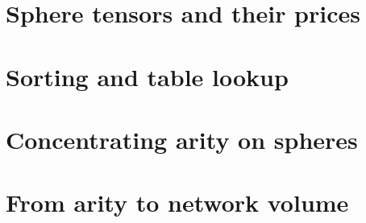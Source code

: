 \documentclass[11pt]{article}
\begin{document}
\maketitle

\begin{abstract}
We prove that the exponent of square matrix multiplication is \(9/4\) over
every field. The upper bound was known. For each \(n\ge2\), a formal
arithmetic circuit multiplying two \(n\times n\) matrices needs at least
\(n^{9/4}/2\) multiplication or division gates. The proof shows that a smaller exponent would compress tensor networks
enough to violate a lower bound for testing whether the entries in each
of several independent lists are distinct.
\end{abstract}



\clearpage
{\small\tableofcontents}
\clearpage






\par{}
\part{Sphere tensors and their prices}\label{part:spheres}










\par{}
\part{Sorting and table lookup}\label{part:sorting}


\par{}
\part{Concentrating arity on spheres}\label{part:local}


\par{}
\part{From arity to network volume}\label{part:volume}






\end{document}
